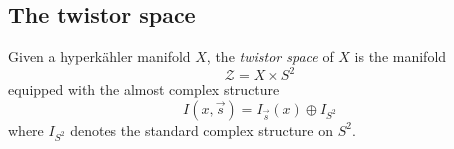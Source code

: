 \documentclass[12pt,letterpaper,reqno]{article}
\numberwithin{equation}{section}
\newcommand{\cZ}{\ensuremath{\mathcal Z}}
\newcommand{\cO}{\ensuremath{\mathcal O}}
\newcommand{\C}{\ensuremath{\mathbb C}}
\newcommand{\PP}{\ensuremath{\mathbb P}}
\newcommand{\hk}{hyperk\"ahler\xspace}
\newcommand{\ti}[1]{\textit{#1}}
\newcommand{\fixme}[1]{{\color{orange}{[#1]}}}
\begin{document}



\subsection{The twistor space}

\begin{defn} Given a \hk manifold $X$, the \ti{twistor space} of $X$ is the manifold
\begin{equation}
  \cZ = X \times S^2
\end{equation}
equipped with the almost complex structure
\begin{equation}
  I(x,\vec s) = I_{\vec s}(x) \oplus I_{S^2}
\end{equation}
where $I_{S^2}$ denotes the
standard complex structure on $S^2$.
\end{defn}
\end{document}
